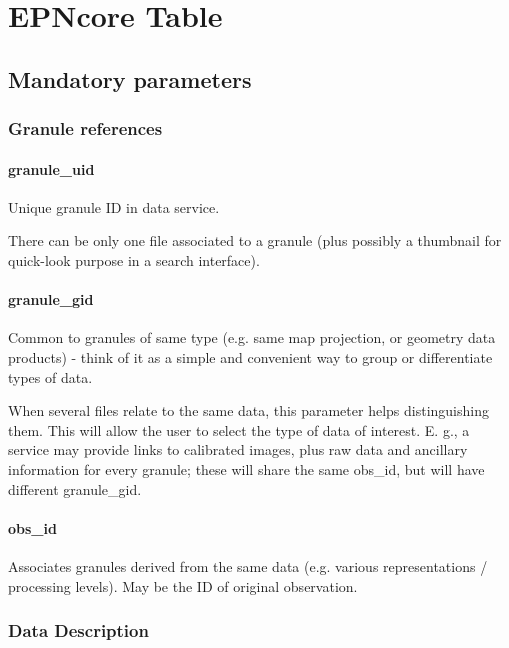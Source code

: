 \documentclass[11pt,a4paper]{ivoa}
\begin{document}


\section{EPNcore Table}

\subsection{Mandatory parameters}

\subsubsection{Granule references}

\paragraph{granule\_uid}

Unique granule ID in data service.

There can be only one file associated to a granule (plus possibly a thumbnail for quick-look purpose in a search interface).

\paragraph{granule\_gid}

Common to granules of same type (e.g. same map projection, or geometry data products) - think of it as a simple and convenient way to group or differentiate types of data.

When several files relate to the same data, this parameter helps distinguishing them. This will allow the user to select the type of data of interest. E. g., a service may provide links to calibrated images, plus raw data and ancillary information for every granule; these will share the same obs\_id, but will have different granule\_gid.

\paragraph{obs\_id}

Associates granules derived from the same data (e.g. various representations / processing levels). May be the ID of original observation.

\subsubsection{Data Description}
\end{document}
